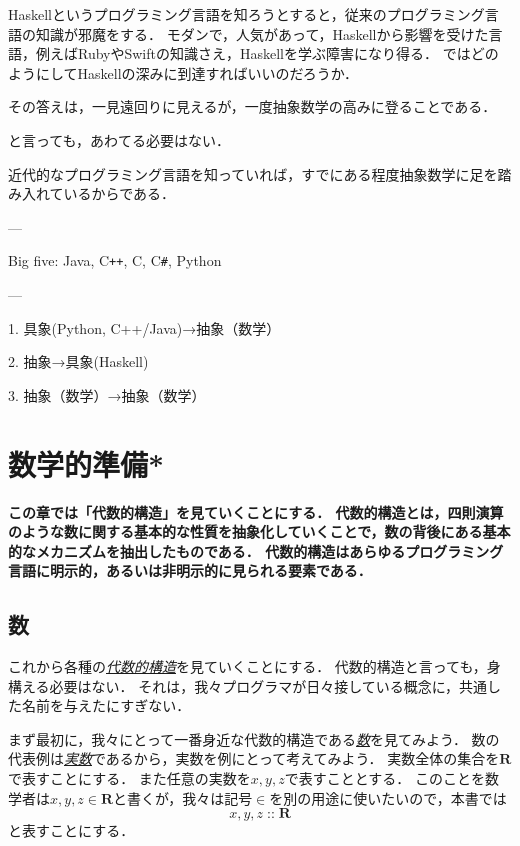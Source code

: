 \documentclass[twocolumn]{jsbook}
\newcommand{\cxx}{\textrm{C}\texttt{++}}
\newcommand{\keyword}[1]{\underline{\emph{#1}}}
\newenvironment{leader}{\begingroup\bf}{\endgroup}
\DeclareMathOperator{\mathIn}{::}
\newcommand{\mathSet}[1]{\mathbf{#1}}
\begin{document}
Haskellというプログラミング言語を知ろうとすると，従来のプログラミング言語の知識が邪魔をする．
モダンで，人気があって，Haskellから影響を受けた言語，例えばRubyやSwiftの知識さえ，Haskellを学ぶ障害になり得る．
ではどのようにしてHaskellの深みに到達すればいいのだろうか．

その答えは，一見遠回りに見えるが，一度抽象数学の高みに登ることである．

と言っても，あわてる必要はない．

近代的なプログラミング言語を知っていれば，すでにある程度抽象数学に足を踏み入れているからである．

---

Big five: Java, \cxx, C, C\texttt{\#}, Python

---

1. 具象(Python, C++/Java)→抽象（数学）

2. 抽象→具象(Haskell)

3. 抽象（数学）→抽象（数学）

\chapter{数学的準備*}

\begin{leader}
この章では「代数的構造」を見ていくことにする．
代数的構造とは，四則演算のような数に関する基本的な性質を抽象化していくことで，数の背後にある基本的なメカニズムを抽出したものである．
代数的構造はあらゆるプログラミング言語に明示的，あるいは非明示的に見られる要素である．
\end{leader}

\section{数}

これから各種の\keyword{代数的構造}を見ていくことにする．
代数的構造と言っても，身構える必要はない．
それは，我々プログラマが日々接している概念に，共通した名前を与えたにすぎない．

まず最初に，我々にとって一番身近な代数的構造である\keyword{数}を見てみよう．
数の代表例は\keyword{実数}であるから，実数を例にとって考えてみよう．
実数全体の集合を$\mathSet{R}$で表すことにする．
また任意の実数を$x,y,z$で表すこととする．
このことを数学者は$x,y,z\in\mathSet{R}$と書くが，我々は記号$\in$を別の用途に使いたいので，本書では$$x,y,z\mathIn\mathSet{R}$$と表すことにする．
\end{document}
